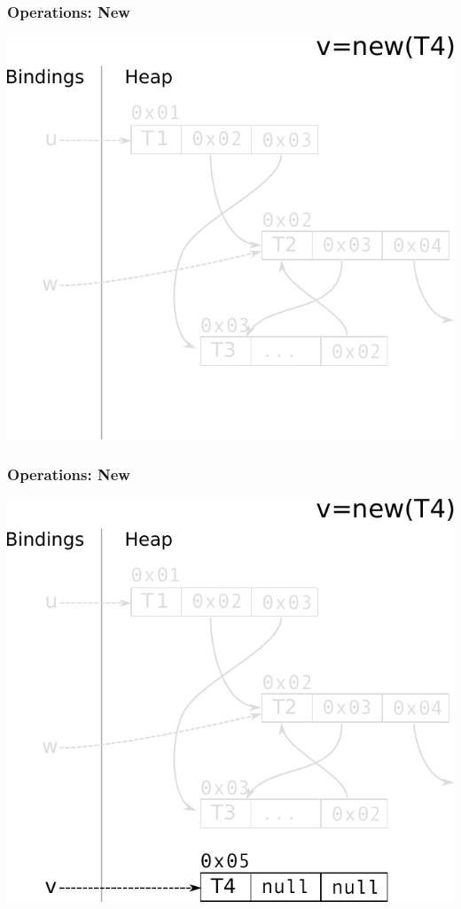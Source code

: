 \documentclass[utf8x]{beamer}
\begin{document}
\begin{frame}[plain]
  \frametitle{Operations: New}
  \includegraphics[scale=0.8]{figures/new01}
\end{frame}

\begin{frame}[plain]
  \frametitle{Operations: New}
  \includegraphics[scale=0.8]{figures/new02}
\end{frame}
\end{document}
